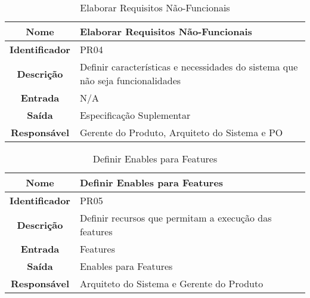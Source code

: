 {              \begin{table}[H]
                \centering
                \caption{Elaborar Requisitos Não-Funcionais}
                \begin{tabular}{c|p{10cm}}
                    \hline
                    \textbf{Nome}            & Elaborar Requisitos Não-Funcionais\\
                    \hline
                    \textbf{Identificador} & PR04\\
                    \hline
                    \textbf{Descrição}   & Definir características e necessidades do sistema que não seja funcionalidades\\
                    \hline
                    \textbf{Entrada}           & N/A\\
                    \hline
                    \textbf{Saída}            &  Especificação Suplementar\\
                    \hline
                    \textbf{Responsável}            & Gerente do Produto, Arquiteto do Sistema e PO\\
                    \hline
                \end{tabular}
            \end{table}

              \begin{table}[H]
                \centering
                \caption{Definir Enables para Features}
                \begin{tabular}{c|p{10cm}}
                    \hline
                    \textbf{Nome}            & Definir Enables para Features\\
                    \hline
                    \textbf{Identificador} & PR05\\
                    \hline
                    \textbf{Descrição}   & Definir recursos que permitam a execução das features\\
                    \hline
                    \textbf{Entrada}           & Features\\
                    \hline
                    \textbf{Saída}            &  Enables para Features\\
                    \hline
                    \textbf{Responsável}            & Arquiteto do Sistema e Gerente do Produto\\
                    \hline
                \end{tabular}
            \end{table}

}
